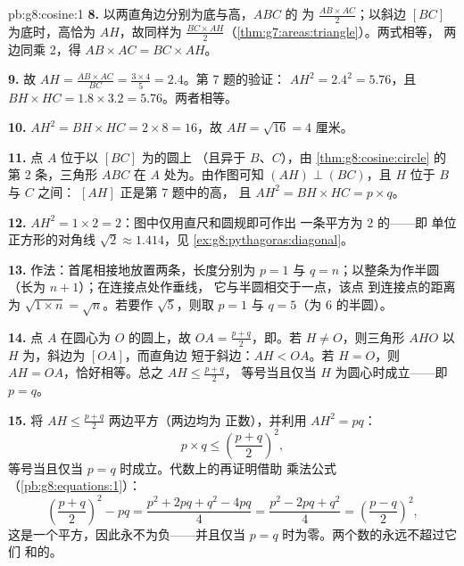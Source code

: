\begin{solution}{pb:g8:cosine:1}
\textbf{8.} 以两直角边分别为底与高，$ABC$ 的
为 $\frac{AB \times AC}{2}$；以斜边 $[BC]$ 为底时，高恰为
$AH$，故同样为
$\frac{BC \times AH}{2}$（\cref{thm:g7:areas:triangle}）。两式相等，
两边同乘 2，得 $AB \times AC = BC \times AH$。

\textbf{9.} 故 $AH = \frac{AB \times AC}{BC} = \frac{3 \times 4}{5}
= 2.4$。第 7 题的验证：
$AH^2 = 2.4^2 = 5.76$，且
$BH \times HC = 1.8 \times 3.2 = 5.76$。两者相等。

\textbf{10.} $AH^2 = BH \times HC = 2 \times 8 = 16$，故
$AH = \sqrt{16} = 4$ 厘米。

\textbf{11.} 点 $A$ 位于以 $[BC]$ 为的圆上
（且异于 $B$、$C$），由
\cref{thm:g8:cosine:circle} 的第 2 条，三角形 $ABC$ 在
$A$ 处为。由作图可知 $(AH) \perp (BC)$，且 $H$ 位于 $B$ 与
$C$ 之间： $[AH]$ 正是第 7 题中的高，
且 $AH^2 = BH \times HC = p \times q$。

\textbf{12.} $AH^2 = 1 \times 2 = 2$：图中仅用直尺和圆规即可作出
一条平方为 $2$ 的——即
单位正方形的对角线 $\sqrt2 \approx 1.414$，见
\cref{ex:g8:pythagoras:diagonal}。

\textbf{13.} 作法：首尾相接地放置两条，长度分别为
$p = 1$ 与 $q = n$；以整条为作半圆
（长为 $n + 1$）；在连接点处作垂线，
它与半圆相交于一点，该点
到连接点的距离为 $\sqrt{1 \times n} = \sqrt n$。若要作
$\sqrt5$，则取 $p = 1$ 与 $q = 5$（为
$6$ 的半圆）。

\textbf{14.} 点 $A$ 在圆心为 $O$ 的圆上，故
$OA = \frac{p+q}{2}$，即。若 $H \neq O$，则三角形
$AHO$ 以 $H$ 为，斜边为 $[OA]$，而直角边
短于斜边：$AH < OA$。若 $H = O$，则
$AH = OA$，恰好相等。总之 $AH \leq \frac{p+q}{2}$，
等号当且仅当 $H$ 为圆心时成立——即
$p = q$。

\textbf{15.} 将 $AH \leq \frac{p+q}{2}$ 两边平方（两边均为
正数），并利用 $AH^2 = pq$：
\[
p \times q \leq \left(\frac{p+q}{2}\right)^2 ,
\]
等号当且仅当 $p = q$ 时成立。代数上的再证明借助
乘法公式（\cref{pb:g8:equations:1}）：
\[
\left(\frac{p+q}{2}\right)^2 - pq
= \frac{p^2 + 2pq + q^2 - 4pq}{4}
= \frac{p^2 - 2pq + q^2}{4}
= \left(\frac{p-q}{2}\right)^2 ,
\]
这是一个平方，因此永不为负——并且仅当
$p = q$ 时为零。两个数的永远不超过它们
和的。
\end{solution}
